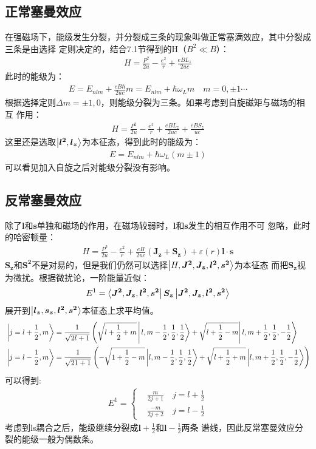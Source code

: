 \documentclass[UTF8]{article}
\numberwithin{equation}{section}
\begin{document}
\subsection{正常塞曼效应}
在强磁场下，能级发生分裂，并分裂成三条的现象叫做正常塞满效应，其中分裂成三条是由选择
定则决定的，结合7.1节得到的H（$B^2 \ll B$）：
\begin{align*}
    H = \frac{P^2}{2u}-\frac{e^2}{r}+\frac{eBL_z}{2uc}
\end{align*}
此时的能级为：
\begin{align*}
    E = E_{nlm}+\frac{eB\hbar}{2uc}m=E_{nlm}+\hbar \omega_L m\quad m = 0,\pm 1\cdots
\end{align*}
根据选择定则$\Delta m =\pm 1,0$，则能级分裂为三条。如果考虑到自旋磁矩与磁场的相互
作用：
\begin{align*}
    H = \frac{P^2}{2u}-\frac{e^2}{r}+\frac{eBL_z}{2uc}+\frac{eBS_z}{uc}
\end{align*}
这里还是选取$\ket{\bm{l^2},\bm{l_z}}$为本征态，得到此时的能级为：
\begin{align*}
    E = E_{nlm}+\hbar \omega_L (m\pm 1)
\end{align*}
可以看见加入自旋之后对能级分裂没有影响。
\subsection{反常塞曼效应}
除了$\bm{l}$和$\bm{s}$单独和磁场的作用，在磁场较弱时，$\bm{l}$和$\bm{s}$发生的相互作用不可
忽略，此时的哈密顿量：
\begin{align*}
    H = \frac{P^2}{2u}-\frac{e^2}{r}+\frac{eB}{2uc}(\bm{J_z}+\bm{S_z})+\varepsilon(r)\bm{l}\cdot \bm{s}
\end{align*}
$\bm{S_z}$和$\bm{S^2}$不是对易的，但是我们仍然可以选择$\ket{H,\bm{J^2},\bm{J_z},\bm{l^2},\bm{s^2}}$为本征态
而把$\bm{S_z}$视为微扰。根据微扰论，一阶能量近似：
\begin{align*}
    E^{1} = \bra{\bm{J^2},\bm{J_z},\bm{l^2},\bm{s^2}}\bm{S_z}\ket{\bm{J^2},\bm{J_z},\bm{l^2},\bm{s^2}}
\end{align*}
展开到$\ket{\bm{l_z},\bm{s_z},\bm{l^2},\bm{s^2}}$本征态上求平均值。
\begin{align*}
     & \left|j=l+\frac{1}{2}, m\right\rangle=\frac{1}{\sqrt{2l+1}}
    \left(\sqrt{l+\frac{1}{2}+m}\left|\left.l, m-\frac{1}{2}, \frac{1}{2}, \frac{1}{2}\right\rangle+
    \sqrt{l+\frac{1}{2}-m}\right| l, m+\frac{1}{2}, \frac{1}{2},-\frac{1}{2}\right\rangle \\
     & \ket{j=l-\frac{1}{2},m}=\frac{1}{\sqrt{21+1}}\left(-\sqrt{1+\frac{1}{2}-m}\ket{l,m-\frac{1}{2},\frac{1}{2},\frac{1}{2}}+\sqrt{l+\frac{1}{2}+m}
    \ket{l, m+\frac{1}{2}, \frac{1}{2},-\frac{1}{2}}\right)
\end{align*}
可以得到:
\begin{align*}
    E^1 = \begin{cases}
        &\frac{m}{2j+1}\quad j = l+\frac{1}{2}\\
        &\frac{-m}{2j+2} \quad j = l-\frac{1}{2}
    \end{cases}
\end{align*}
考虑到ls耦合之后，能级继续分裂成$\bm{l}+\frac{1}{2}$和$\bm{l}-\frac{1}{2}$两条
谱线，因此反常塞曼效应分裂的能级一般为偶数条。
\end{document}
